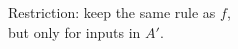 \documentclass[preview]{standalone}
\begin{document}
\begin{center}
Restriction: keep the same rule as $f$,\\but only for inputs in $A'$.
\end{center}
\end{document}
